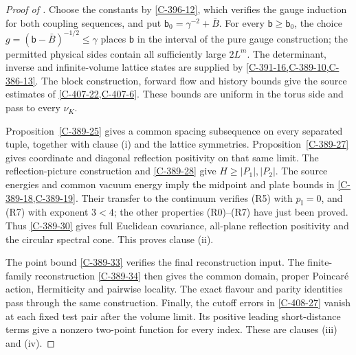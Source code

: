 \documentclass[11pt,letterpaper,reqno]{amsart}
\theoremstyle{definition}
\theoremstyle{remark}
\begin{document}
\begin{proof}[Proof of ]
Choose the constants by \cref{C-396-12}, which verifies
the gauge induction for both coupling sequences, and put
$\mathsf b_0=\gamma^{-2}+\bar B$. For every
$\mathsf b\ge\mathsf b_0$, the choice
$g=(\mathsf b-\bar B)^{-1/2}\le\gamma$ places
$\mathsf b$ in the interval of the pure gauge construction;
the permitted physical sides contain all sufficiently large
$2L^m$. The determinant, inverse and infinite-volume lattice
states are supplied by \cref{C-391-16,C-389-10,C-386-13}.
The block construction, forward flow and
history bounds give the source estimates of
\cref{C-407-22,C-407-6}. These bounds are uniform in the
torus side and pass to every $\nu_K$.

Proposition~\ref{C-389-25} gives a common spacing subsequence
on every separated tuple, together with clause \textup{(i)}
and the lattice symmetries. Proposition~\ref{C-389-27}
gives coordinate and diagonal reflection positivity on
that same limit. The reflection-picture construction and
\cref{C-389-28} give $H\ge|P_1|,|P_2|$.
The source energies and common vacuum energy imply the
midpoint and plate bounds in \cref{C-389-18,C-389-19}.
Their transfer to the continuum verifies (R5) with
$p_{\mathrm I}=0$, and (R7) with exponent $3<4$;
the other properties (R0)--(R7) have just been proved.
Thus \cref{C-389-30} gives full Euclidean covariance,
all-plane reflection positivity and the circular spectral
cone. This proves clause \textup{(ii)}.

The point bound \cref{C-389-33} verifies the final
reconstruction input. The finite-family reconstruction
\cref{C-389-34} then gives the common domain, proper
Poincar\'e action, Hermiticity and pairwise locality.
The exact flavour and parity identities pass through
the same construction. Finally, the cutoff errors in
\cref{C-408-27} vanish at each fixed test pair after
the volume limit. Its positive leading short-distance
terms give a nonzero two-point function for every index.
These are clauses \textup{(iii)} and \textup{(iv)}.
\end{proof}
\end{document}
